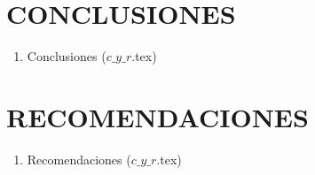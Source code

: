 \chapter{CONCLUSIONES}

\vspace{6pt}

\begin{enumerate}[1.\hspace{5ex}]
    \item Conclusiones ($c\_y\_r$.tex)
\end{enumerate}


\chapter{RECOMENDACIONES}

\vspace{6pt}

\begin{enumerate}[1.\hspace{5ex}]
    \item Recomendaciones ($c\_y\_r$.tex)
\end{enumerate}

